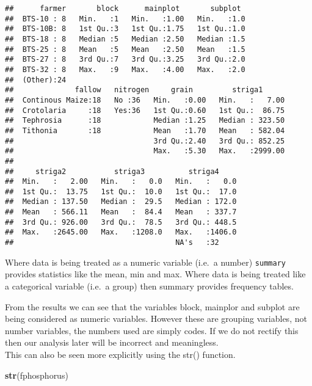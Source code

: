 \documentclass[]{book}
\newenvironment{Shaded}{\begin{snugshade}}{\end{snugshade}}
\newcommand{\KeywordTok}[1]{\textcolor[rgb]{0.13,0.29,0.53}{\textbf{#1}}}
\newcommand{\NormalTok}[1]{#1}
\theoremstyle{definition}
\theoremstyle{definition}
\theoremstyle{definition}
\theoremstyle{remark}
\begin{document}
\begin{verbatim}
##      farmer       block      mainplot       subplot   
##  BTS-10 : 8   Min.   :1   Min.   :1.00   Min.   :1.0  
##  BTS-10B: 8   1st Qu.:3   1st Qu.:1.75   1st Qu.:1.0  
##  BTS-18 : 8   Median :5   Median :2.50   Median :1.5  
##  BTS-25 : 8   Mean   :5   Mean   :2.50   Mean   :1.5  
##  BTS-27 : 8   3rd Qu.:7   3rd Qu.:3.25   3rd Qu.:2.0  
##  BTS-32 : 8   Max.   :9   Max.   :4.00   Max.   :2.0  
##  (Other):24                                           
##              fallow   nitrogen     grain         striga1       
##  Continous Maize:18   No :36   Min.   :0.00   Min.   :   7.00  
##  Crotolaria     :18   Yes:36   1st Qu.:0.60   1st Qu.:  86.75  
##  Tephrosia      :18            Median :1.25   Median : 323.50  
##  Tithonia       :18            Mean   :1.70   Mean   : 582.04  
##                                3rd Qu.:2.40   3rd Qu.: 852.25  
##                                Max.   :5.30   Max.   :2999.00  
##                                                                
##     striga2           striga3          striga4      
##  Min.   :   2.00   Min.   :   0.0   Min.   :   0.0  
##  1st Qu.:  13.75   1st Qu.:  10.0   1st Qu.:  17.0  
##  Median : 137.50   Median :  29.5   Median : 172.0  
##  Mean   : 566.11   Mean   :  84.4   Mean   : 337.7  
##  3rd Qu.: 926.00   3rd Qu.:  78.5   3rd Qu.: 448.5  
##  Max.   :2645.00   Max.   :1208.0   Max.   :1406.0  
##                                     NA's   :32
\end{verbatim}

Where data is being treated as a numeric variable (i.e.~a number)
\texttt{summary} provides statistics like the mean, min and max. Where
data is being treated like a categorical variable (i.e.~a group) then
summary provides frequency tables.

From the results we can see that the variables block, mainplor and
subplot are being considered as numeric variables. However these are
grouping variables, not number variables, the numbers used are simply
codes. If we do not rectify this then our analysis later will be
incorrect and meaningless.\\
This can also be seen more explicitly using the str() function.

\begin{Shaded}
\begin{Highlighting}[]
\KeywordTok{str}\NormalTok{(fphosphorus)}
\end{Highlighting}
\end{Shaded}
\end{document}
